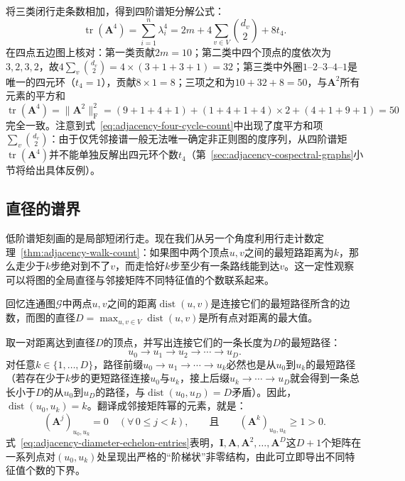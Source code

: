 将三类闭行走条数相加，得到四阶谱矩分解公式：
\begin{equation}
\operatorname{tr}(\bm A^4)=\sum_{i=1}^n\lambda_i^4
=2m+4\sum_{v\in V}\binom{d_v}{2}+8t_4.
\label{eq:adjacency-four-cycle-count}
\end{equation}
在四点五边图上核对：第一类贡献$2m=10$；第二类中四个顶点的度依次为$3,2,3,2$，故$4\sum_v\binom{d_v}{2}=4\times(3+1+3+1)=32$；第三类中外圈$1\text{--}2\text{--}3\text{--}4\text{--}1$是唯一的四元环（$t_4=1$），贡献$8\times 1=8$；三项之和为$10+32+8=50$，与$\bm A^2$所有元素的平方和$\operatorname{tr}(\bm A^4)=\|\bm A^2\|_{\mathrm F}^2=(9+1+4+1)+(1+4+1+4)\times 2+(4+1+9+1)=50$完全一致。注意到式~\eqref{eq:adjacency-four-cycle-count}中出现了度平方和项$\sum_v\binom{d_v}{2}$：由于仅凭邻接谱一般无法唯一确定非正则图的度序列，从四阶谱矩$\operatorname{tr}(\bm A^4)$并不能单独反解出四元环个数$t_4$（第~\ref{sec:adjacency-cospectral-graphs}小节将给出具体反例）。

\subsection{直径的谱界}
\label{sec:adjacency-diameter-bound}

低阶谱矩刻画的是局部短闭行走。现在我们从另一个角度利用行走计数定理~\ref{thm:adjacency-walk-count}：如果图中两个顶点$u,v$之间的最短路距离为$k$，那么走少于$k$步绝对到不了$v$，而走恰好$k$步至少有一条路线能到达$v$。这一定性观察可以将图的全局直径与邻接矩阵不同特征值的个数联系起来。

回忆连通图$\mathcal G$中两点$u,v$之间的距离$\operatorname{dist}(u,v)$是连接它们的最短路径所含的边数，而图的直径$D=\max_{u,v\in V}\operatorname{dist}(u,v)$是所有点对距离的最大值。

取一对距离达到直径$D$的顶点，并写出连接它们的一条长度为$D$的最短路径：
\[
u_0\to u_1\to u_2\to\cdots\to u_D.
\]
对任意$k\in\{1,\ldots,D\}$，路径前缀$u_0\to u_1\to\cdots\to u_k$必然也是从$u_0$到$u_k$的最短路径（若存在少于$k$步的更短路径连接$u_0$与$u_k$，接上后缀$u_k\to\cdots\to u_D$就会得到一条总长小于$D$的从$u_0$到$u_D$的路径，与$\operatorname{dist}(u_0,u_D)=D$矛盾）。因此，$\operatorname{dist}(u_0,u_k)=k$。翻译成邻接矩阵幂的元素，就是：
\begin{equation}
(\bm A^j)_{u_0,u_k}=0\quad(\forall\,0\leq j<k),
\qquad\text{且}\qquad
(\bm A^k)_{u_0,u_k}\geq 1>0.
\label{eq:adjacency-diameter-echelon-entries}
\end{equation}
式~\eqref{eq:adjacency-diameter-echelon-entries}表明，$\bm I,\bm A,\bm A^2,\ldots,\bm A^D$这$D+1$个矩阵在一系列点对$(u_0,u_k)$处呈现出严格的“阶梯状”非零结构，由此可立即导出不同特征值个数的下界。

